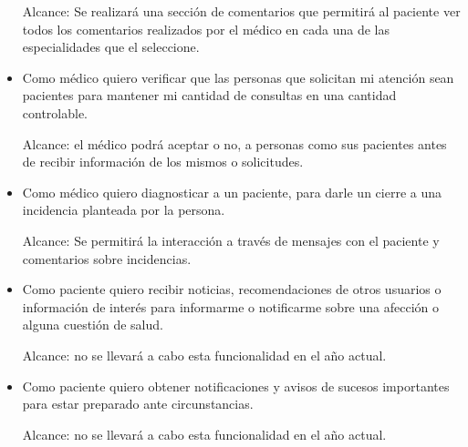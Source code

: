 \begin{itemize}
    Alcance: Se realizará una sección de comentarios que permitirá al paciente ver todos los comentarios realizados por el médico en cada una de las especialidades que el seleccione.
    
    

	\item Como médico quiero verificar que las personas que solicitan mi atención sean pacientes para mantener mi cantidad de consultas en una cantidad controlable.
    
    Alcance: el médico podrá aceptar o no, a personas como sus pacientes antes de recibir información de los mismos o solicitudes.
	\item Como médico quiero diagnosticar a un paciente, para darle un cierre a una incidencia planteada por la persona.
    
    Alcance: Se permitirá la interacción a través de mensajes con el paciente y comentarios sobre incidencias.
	
    \item Como paciente quiero recibir noticias, recomendaciones de otros usuarios o información de interés para informarme o notificarme sobre una afección o alguna cuestión de salud.
    
    Alcance: no se llevará a cabo esta funcionalidad en el año actual. %
    
	\item Como paciente quiero obtener notificaciones y avisos de sucesos importantes para estar preparado ante circunstancias.
    
    Alcance: no se llevará a cabo esta funcionalidad en el año actual. %
    
\end{itemize}
